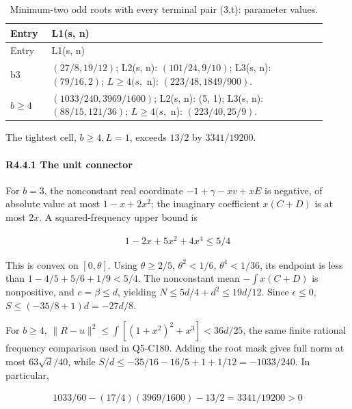 \begingroup\small
\setlength{\tabcolsep}{3pt}
\setlength{\LTleft}{0pt}\setlength{\LTright}{\fill}
\begin{longtable}{@{}p{0.1200\linewidth}p{0.8000\linewidth}@{}}
\caption{Minimum-two odd roots with every terminal pair (3,t): parameter values.}\label{tab:parameters:r2-c004:3}\\
\toprule
Entry & L1(s, n) \\
\midrule\endfirsthead
\toprule
Entry & L1(s, n) \\
\midrule\endhead
\bottomrule\endfoot
b3 & \((27/8,\allowbreak 19/12)\); L2(s, n): \((101/24,\allowbreak 9/10)\); L3(s, n): \((79/16,\allowbreak 2)\); \(L\ge 4(s,\allowbreak \) n): \((223/48,\allowbreak 1849/900)\). \\
\addlinespace[2pt]
\(b\ge 4\) & \((1033/240,\allowbreak 3969/1600)\); L2(s, n): (5, 1); L3(s, n): \((88/15,\allowbreak 121/36)\); \(L\ge 4(s,\allowbreak \) n): \((223/40,\allowbreak 25/9)\). \\
\end{longtable}
\endgroup


The tightest cell, \(b\ge4,\allowbreak \allowbreak  L=1\), exceeds \(13/2\) by \(3341/19200\).

\paragraph{R4.4.1 The unit connector}

For \(b=3\), the nonconstant real coordinate \(-1+\gamma-xv+xE\) is negative, of absolute value at most \(1-x+2x^2\); the imaginary coefficient \(x(C+D)\) is at most \(2x\). A squared-frequency upper bound is

\[
\begin{gathered}
1-2x+5x^2+4x^4\le 5/4
\end{gathered}
\]

This is convex on \([0,\allowbreak \allowbreak  \theta]\). Using \(\theta\ge2/5\), \(\theta^2<1/6\), \(\theta^4<1/36\), its endpoint is less than \(1-4/5+5/6+1/9<5/4\). The nonconstant mean \(-\int x(C+D)\) is nonpositive, and \(c=\beta\le d\), yielding \(N\le5d/4+d^2\le19d/12\). Since \(\epsilon\le0\), \(S\le(-35/8+1)d=-27d/8\).

For \(b\ge4\), \(\|R-u\|^2\le\int[(1+x^2)^2+x^3]<36d/25\), the same finite rational frequency comparison used in Q5-C180. Adding the root mask gives full norm at most \(63\sqrt d/40\), while \(S/d\le-35/16-16/5+1+1/12=-1033/240\). In particular,

\[
\begin{gathered}
1033/60-(17/4)(3969/1600)-13/2=3341/19200>0
\end{gathered}
\]

